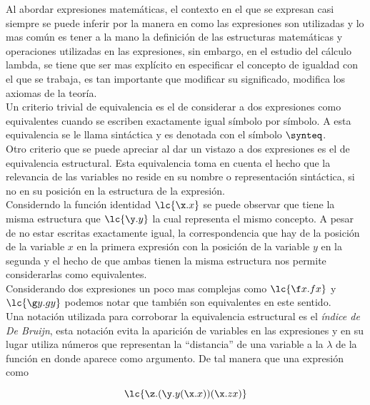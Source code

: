 Al abordar expresiones matemáticas, el contexto en el que se expresan casi
siempre se puede inferir por la manera en como las expresiones son utilizadas y
lo mas común es tener a la mano la definición de las estructuras matemáticas y
operaciones utilizadas en las expresiones, sin embargo, en el estudio del
cálculo lambda, se tiene que ser mas explícito en especificar el concepto de
igualdad con el que se trabaja, es tan importante que modificar su significado,
modifica los axiomas de la teoría. \\


Un criterio trivial de equivalencia es el de considerar a dos expresiones como
equivalentes cuando se escriben exactamente igual símbolo por símbolo. A esta
equivalencia se le llama sintáctica y es denotada con el símbolo \(\synteq\). \\

Otro criterio que se puede apreciar al dar un vistazo a dos expresiones es el de
equivalencia estructural. Esta equivalencia toma en cuenta el hecho que la
relevancia de las variables no reside en su nombre o representación
sintáctica, si no en su posición en la estructura de la expresión. \\

Considerndo la función identidad \(\lc{\x.x}\) se puede observar que tiene la
misma estructura que \(\lc{\y.y}\) la cual representa el mismo concepto. A pesar
de no estar escritas exactamente igual, la correspondencia que hay de la
posición de la variable \(x\) en la primera expresión con la posición de la
variable \(y\) en la segunda y el hecho de que ambas tienen la misma estructura
nos permite considerarlas como equivalentes. \\ 

Considerando dos expresiones un poco mas complejas como \(\lc{\f x.f x}\) y
\(\lc{\g y.g y}\) podemos notar que también son equivalentes en este sentido. \\

Una notación utilizada para corroborar la equivalencia estructural es el
\emph{índice de De Bruijn}, esta notación evita la aparición de variables en las
expresiones y en su lugar utiliza números que representan la ``distancia'' de una
variable a la \(\lambda\) de la función en donde aparece como argumento. De tal
manera que una expresión como

\begin{equation}\label{eq:2.1} \lc{\z.(\y.y (\x.x))(\x. z x)}
\end{equation}

